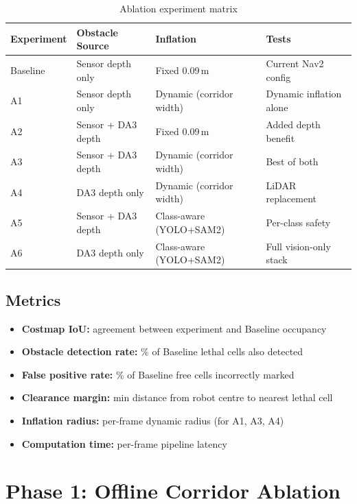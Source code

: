 \documentclass[11pt,a4paper]{article}
\begin{document}
\begin{table}[h]
\centering
\caption{Ablation experiment matrix}
\label{tab:experiments}
\begin{tabular}{llll}
\toprule
\textbf{Experiment} & \textbf{Obstacle Source} & \textbf{Inflation} & \textbf{Tests} \\
\midrule
Baseline & Sensor depth only     & Fixed 0.09\,m            & Current Nav2 config \\
A1       & Sensor depth only     & Dynamic (corridor width)  & Dynamic inflation alone \\
A2       & Sensor + DA3 depth    & Fixed 0.09\,m            & Added depth benefit \\
A3       & Sensor + DA3 depth    & Dynamic (corridor width)  & Best of both \\
A4       & DA3 depth only        & Dynamic (corridor width)  & LiDAR replacement \\
A5       & Sensor + DA3 depth    & Class-aware (YOLO+SAM2)  & Per-class safety \\
A6       & DA3 depth only        & Class-aware (YOLO+SAM2)  & Full vision-only stack \\
\bottomrule
\end{tabular}
\end{table}

\subsection{Metrics}

\begin{itemize}[nosep]
  \item \textbf{Costmap IoU:} agreement between experiment and Baseline occupancy
  \item \textbf{Obstacle detection rate:} \% of Baseline lethal cells also detected
  \item \textbf{False positive rate:} \% of Baseline free cells incorrectly marked
  \item \textbf{Clearance margin:} min distance from robot centre to nearest lethal cell
  \item \textbf{Inflation radius:} per-frame dynamic radius (for A1, A3, A4)
  \item \textbf{Computation time:} per-frame pipeline latency
\end{itemize}

\section{Phase 1: Offline Corridor Ablation}
\label{sec:phase1-corridor}
\end{document}
